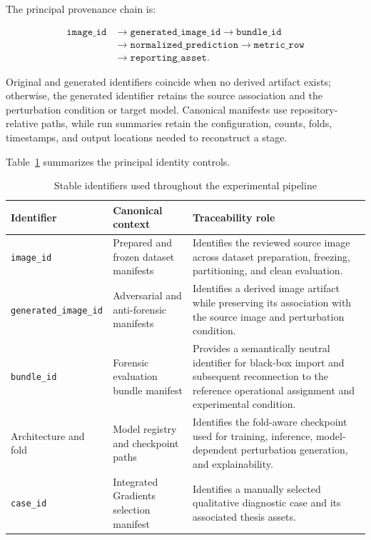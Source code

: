The principal provenance chain is:

\[
\begin{aligned}
\texttt{image\_id}
&\longrightarrow \texttt{generated\_image\_id}
\longrightarrow \texttt{bundle\_id} \\
&\longrightarrow \texttt{normalized\_prediction}
\longrightarrow \texttt{metric\_row} \\
&\longrightarrow \texttt{reporting\_asset}.
\end{aligned}
\]

Original and generated identifiers coincide when no derived artifact exists;
otherwise, the generated identifier retains the source association and the
perturbation condition or target model. Canonical manifests use
repository-relative paths, while run summaries retain the configuration,
counts, folds, timestamps, and output locations needed to reconstruct a stage.

Table~\ref{tab:implementation-identity-controls} summarizes the principal
identity controls.

\begin{table}[H]
\centering
\scriptsize
\renewcommand{\arraystretch}{1.15}
\setlength{\tabcolsep}{4pt}
\caption{Stable identifiers used throughout the experimental pipeline}
\label{tab:implementation-identity-controls}
\begin{tabularx}{\textwidth}{@{}p{} p{} X@{}}
\toprule
\textbf{Identifier} &
\textbf{Canonical context} &
\textbf{Traceability role} \\
\midrule

\texttt{image\_id}
&
Prepared and frozen dataset manifests
&
Identifies the reviewed source image across dataset preparation, freezing,
partitioning, and clean evaluation. \\

\texttt{generated\_image\_id}
&
Adversarial and anti-forensic manifests
&
Identifies a derived image artifact while preserving its association with the
source image and perturbation condition. \\

\texttt{bundle\_id}
&
Forensic evaluation bundle manifest
&
Provides a semantically neutral identifier for black-box import and subsequent
reconnection to the reference operational assignment and experimental
condition. \\

Architecture and fold
&
Model registry and checkpoint paths
&
Identifies the fold-aware checkpoint used for training, inference,
model-dependent perturbation generation, and explainability. \\

\texttt{case\_id}
&
Integrated Gradients selection manifest
&
Identifies a manually selected qualitative diagnostic case and its associated
thesis assets. \\

\bottomrule
\end{tabularx}
\end{table}

